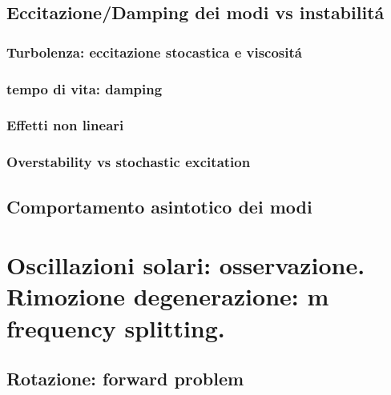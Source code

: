 \begin{refsection}

\section{Eccitazione/Damping dei modi vs instabilit\'a}

\begingroup
\nocite{*}
\let\clearpage\relax

\printbibliography[filter=smodesexcitation,keyword={rev},heading=bibintoc,title={\textcolor{amber}{Biblio about: ''Eccitazione modi solari''}}]
\printbibliography[filter=smodesexcitation,notkeyword={rev},heading=bibintoc,title={\textcolor{amber}{Other refs about: ''Eccitazione modi solari''}}]

\endgroup

\subsection{Turbolenza: eccitazione stocastica e viscosit\'a}
\subsection{tempo di vita: damping}
\subsection{Effetti non lineari}
\subsection{Overstability vs stochastic excitation}

\section{Comportamento asintotico dei modi}

\end{refsection}


{\let\clearpage\relax
\chapter{Oscillazioni solari: osservazione. Rimozione degenerazione: m frequency splitting.}}
\PartialToc

\section{Rotazione: forward problem}

